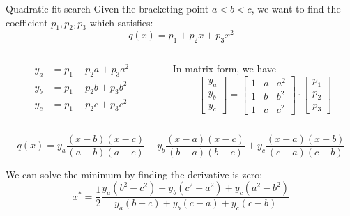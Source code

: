 \documentclass{beamer}
\begin{document}
\begin{frame}{Quadratic fit search}
Given the bracketing point $a<b<c$, we want to find the coefficient $p_1, p_2, p_3$ which satisfies:
\begin{equation*}
    q(x) = p_1 + p_2x + p_3x^2
\end{equation*}
\begin{columns}
\begin{column}{.4\textwidth}
\begin{equation*}
    \begin{split}
        y_a &= p_1 + p_2a + p_3a^2\\
        y_b &= p_1 + p_2b + p_3b^2\\
        y_c &= p_1 + p_2c + p_3c^2
    \end{split}
\end{equation*}
\end{column}

\begin{column}{.6\textwidth}
In matrix form, we have \\
\begin{equation*}
\begin{bmatrix}
y_a\\
y_b\\
y_c
\end{bmatrix}
= 
\begin{bmatrix}
1 & a & a^2\\
1 & b & b^2\\
1 & c & c^2
\end{bmatrix}
\cdot
\begin{bmatrix}
p_1\\
p_2\\
p_3
\end{bmatrix}
\end{equation*}

\end{column}
\end{columns}

\begin{equation*}
    q(x) = y_a\frac{(x-b)(x-c)}{(a-b)(a-c)} + y_b\frac{(x-a)(x-c)}{(b-a)(b-c)} + y_c\frac{(x-a)(x-b)}{(c-a)(c-b)} 
\end{equation*}

We can solve the minimum by finding the derivative is zero:
\begin{equation*}
    x^* = \frac{1}{2} \frac{y_a(b^2-c^2) + y_b(c^2-a^2) + y_c(a^2-b^2)}{y_a(b-c) + y_b(c-a) + y_c(c-b)}
\end{equation*}
\end{frame}
\end{document}

